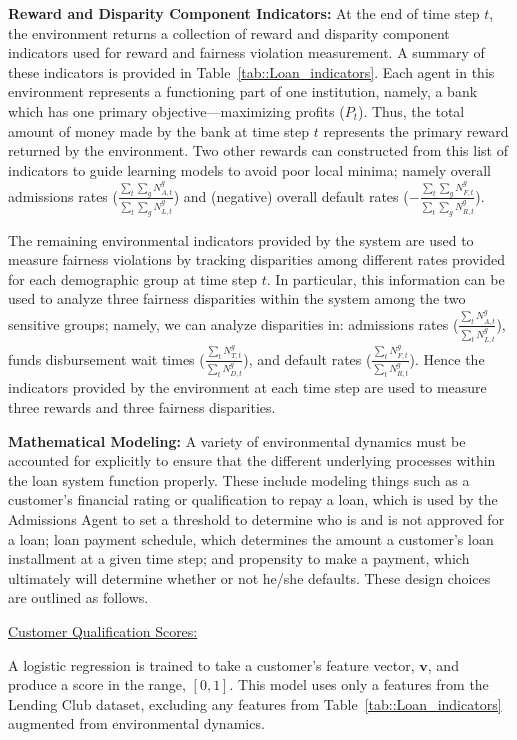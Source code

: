 \textbf{Reward and Disparity Component Indicators:} At the end of time step $t$, the environment returns a collection of reward and disparity component indicators used for reward and fairness violation measurement. A summary of these indicators is provided in Table~\ref{tab::Loan_indicators}. Each agent in this environment represents a functioning part of one institution, namely, a bank which has one primary objective---maximizing profits ($P_t$). Thus, the
total amount of money made by the bank at time step $t$ represents the primary reward returned by the environment. Two other rewards can constructed from this list of indicators to guide learning models to avoid poor local minima; namely overall admissions rates ($\frac{\sum_t \sum_g N_{A,t}^{g}}{\sum_t \sum_g N_{L,t}^{g}}$) and (negative) overall default rates ($-\frac{\sum_t \sum_gN_{F,t}^{g}}{\sum_t \sum_g N_{R,t}^{g}}$). 

The remaining environmental indicators provided by the system are used to measure fairness violations by tracking disparities among different rates provided for each demographic group at time step $t$. In particular, this information can be used to analyze three fairness disparities within the system among the two sensitive groups; namely, we can analyze disparities in: admissions rates ($\frac{\sum_tN_{A,t}^{g}}{\sum_t N_{L,t}^{g}}$), funds disbursement wait times ($\frac{\sum_tN_{T,t}^{g}}{\sum_t N_{D,t}^{g}}$), and default rates ($\frac{\sum_tN_{F,t}^{g}}{\sum_t N_{R,t}^{g}}$). Hence the indicators provided by the environment at each time step are used to measure three rewards and three fairness disparities.

\textbf{Mathematical Modeling:} A variety of environmental dynamics must be accounted for explicitly to ensure that the different underlying processes within the loan system function properly. These include modeling things such as a customer's financial rating or qualification to repay a loan, which is used by the Admissions Agent to set a threshold to determine who is and is not approved for a loan; loan payment schedule, which determines the amount a customer's loan installment at a given time step; and propensity to make a payment, which ultimately will determine whether or not he/she defaults. These design choices are outlined as follows.

\underline{Customer Qualification Scores:} 

A logistic regression is trained to take a customer's feature vector, $\mathbf{v}$, and produce a score in the range, $[0,1]$. This model uses only a features from the Lending Club dataset, excluding any features from Table~\ref{tab::Loan_indicators} augmented from environmental dynamics.

